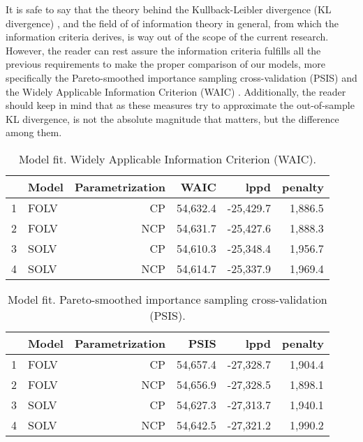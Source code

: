 It is safe to say that the theory behind the Kullback-Leibler divergence (KL divergence) \cite{Kullback_et_al_1951}, and the field of of information theory in general, from which the information criteria derives, is way out of the scope of the current research. However, the reader can rest assure the information criteria fulfills all the previous requirements to make the proper comparison of our models, more specifically the Pareto-smoothed importance sampling cross-validation (PSIS) \cite{vehtari_et_al_2021} and the Widely Applicable Information Criterion (WAIC) \cite{Watanabe_2013}. Additionally, the reader should keep in mind that as these measures try to approximate the out-of-sample KL divergence, is not the absolute magnitude that matters, but the difference among them. 
%
\begin{table}[H]
	\centering
	\begin{tabular}{rlrrrr}
		\hline
		& Model & Parametrization & WAIC & lppd & penalty \\  
		\hline\hline
		1 & FOLV & CP &  54,632.4 & -25,429.7 & 1,886.5 \\ 
		2 & FOLV & NCP & 54,631.7 & -25,427.6 & 1,888.3 \\
		\hline
		3 & SOLV & CP &  54,610.3 & -25,348.4 & 1,956.7 \\  
		4 & SOLV & NCP & 54,614.7 & -25,337.9 & 1,969.4 \\ 
		\hline
	\end{tabular}
	\caption[Model fit. Widely Applicable Information Criterion (WAIC).]%
	{Model fit. Widely Applicable Information Criterion (WAIC).}
	\label{tab:model_fit1}
\end{table}
%
\begin{table}[H]
	\centering
	\begin{tabular}{rlrrrr}
		\hline
		& Model & Parametrization & PSIS & lppd & penalty \\  
		\hline\hline
		1 & FOLV & CP &  54,657.4 & -27,328.7 & 1,904.4 \\ 
		2 & FOLV & NCP & 54,656.9 & -27,328.5 & 1,898.1  \\
		\hline
		3 & SOLV & CP &  54,627.3 & -27,313.7 & 1,940.1 \\  
		4 & SOLV & NCP & 54,642.5 & -27,321.2 & 1,990.2 \\ 
		\hline
	\end{tabular}
	\caption[Model fit. Pareto-smoothed importance sampling cross-validation (PSIS).]%
	{Model fit. Pareto-smoothed importance sampling cross-validation (PSIS).}
	\label{tab:model_fit2}
\end{table} 

